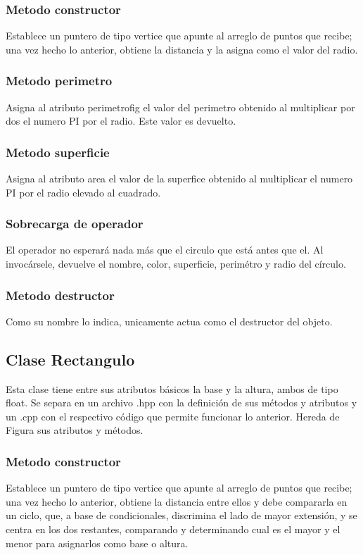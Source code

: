 \documentclass[11pt]{article}
\begin{document}
\subsubsection{Metodo constructor}
	Establece un puntero de tipo vertice que apunte al arreglo de puntos que recibe; una vez hecho lo anterior, obtiene la distancia y la asigna como el valor del radio.

\subsubsection{Metodo perimetro}
	Asigna al atributo perimetrofig el valor del perimetro obtenido al multiplicar por dos el numero PI por el radio. Este valor es devuelto.

\subsubsection{Metodo superficie}
	Asigna al atributo area el valor de la superfice obtenido al multiplicar el numero PI por el radio elevado al cuadrado.

\subsubsection{Sobrecarga de operador ~}
	El operador no esperará nada más que el circulo que está antes que el. Al invocársele, devuelve el nombre, color, superficie, perimétro y radio del círculo.

\subsubsection{Metodo destructor}
	Como su nombre lo indica, unicamente actua como el destructor del objeto.

\subsection{Clase Rectangulo}
	Esta clase tiene entre sus atributos básicos la base y la altura, ambos de tipo float. Se separa en un archivo .hpp con la definición de sus métodos y atributos y un .cpp con el respectivo código que permite funcionar lo anterior.  Hereda de Figura sus atributos y métodos.

\subsubsection{Metodo constructor}
	Establece un puntero de tipo vertice que apunte al arreglo de puntos que recibe; una vez hecho lo anterior, obtiene la distancia entre ellos y debe compararla en un ciclo, que, a base de condicionales, discrimina el lado de mayor extensión, y se centra en los dos restantes, comparando y determinando cual es el mayor y el menor para asignarlos como base o altura.
\end{document}
